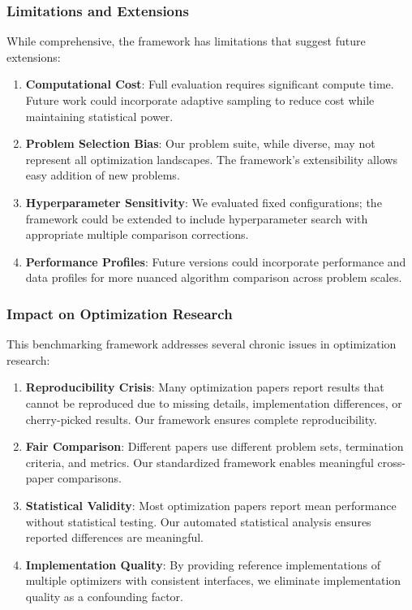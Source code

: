 \hypertarget{limitations-and-extensions}{%
\subsubsection{Limitations and Extensions}\label{limitations-and-extensions}}

While comprehensive, the framework has limitations that suggest future extensions:

\begin{enumerate}
\def\labelenumi{\arabic{enumi}.}
\tightlist
\item
  \textbf{Computational Cost}: Full evaluation requires significant compute time. Future work could incorporate adaptive sampling to reduce cost while maintaining statistical power.
\item
  \textbf{Problem Selection Bias}: Our problem suite, while diverse, may not represent all optimization landscapes. The framework's extensibility allows easy addition of new problems.
\item
  \textbf{Hyperparameter Sensitivity}: We evaluated fixed configurations; the framework could be extended to include hyperparameter search with appropriate multiple comparison corrections.
\item
  \textbf{Performance Profiles}: Future versions could incorporate performance and data profiles for more nuanced algorithm comparison across problem scales.
\end{enumerate}

\hypertarget{impact-on-optimization-research}{%
\subsubsection{Impact on Optimization Research}\label{impact-on-optimization-research}}

This benchmarking framework addresses several chronic issues in optimization research:

\begin{enumerate}
\def\labelenumi{\arabic{enumi}.}
\tightlist
\item
  \textbf{Reproducibility Crisis}: Many optimization papers report results that cannot be reproduced due to missing details, implementation differences, or cherry-picked results. Our framework ensures complete reproducibility.
\item
  \textbf{Fair Comparison}: Different papers use different problem sets, termination criteria, and metrics. Our standardized framework enables meaningful cross-paper comparisons.
\item
  \textbf{Statistical Validity}: Most optimization papers report mean performance without statistical testing. Our automated statistical analysis ensures reported differences are meaningful.
\item
  \textbf{Implementation Quality}: By providing reference implementations of multiple optimizers with consistent interfaces, we eliminate implementation quality as a confounding factor.
\end{enumerate}

